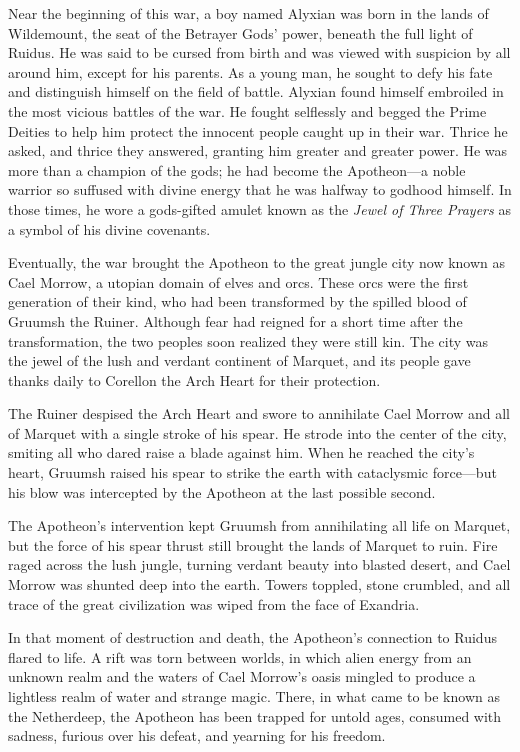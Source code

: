 \documentclass[10pt,a4paper,twoside,fancy,bg=print,twocolumn,openany,nodeprecatedcode]{dndbook}
\begin{document}
Near the beginning of this war, a boy named Alyxian was born in the lands of Wildemount, the seat of the Betrayer Gods' power, beneath the full light of Ruidus. He was said to be cursed from birth and was viewed with suspicion by all around him, except for his parents. As a young man, he sought to defy his fate and distinguish himself on the field of battle. Alyxian found himself embroiled in the most vicious battles of the war. He fought selflessly and begged the Prime Deities to help him protect the innocent people caught up in their war. Thrice he asked, and thrice they answered, granting him greater and greater power. He was more than a champion of the gods; he had become the Apotheon—a noble warrior so suffused with divine energy that he was halfway to godhood himself. In those times, he wore a gods-gifted amulet known as the \textit{Jewel of Three Prayers} as a symbol of his divine covenants.

Eventually, the war brought the Apotheon to the great jungle city now known as Cael Morrow, a utopian domain of elves and orcs. These orcs were the first generation of their kind, who had been transformed by the spilled blood of Gruumsh the Ruiner. Although fear had reigned for a short time after the transformation, the two peoples soon realized they were still kin. The city was the jewel of the lush and verdant continent of Marquet, and its people gave thanks daily to Corellon the Arch Heart for their protection.

The Ruiner despised the Arch Heart and swore to annihilate Cael Morrow and all of Marquet with a single stroke of his spear. He strode into the center of the city, smiting all who dared raise a blade against him. When he reached the city's heart, Gruumsh raised his spear to strike the earth with cataclysmic force—but his blow was intercepted by the Apotheon at the last possible second.

The Apotheon's intervention kept Gruumsh from annihilating all life on Marquet, but the force of his spear thrust still brought the lands of Marquet to ruin. Fire raged across the lush jungle, turning verdant beauty into blasted desert, and Cael Morrow was shunted deep into the earth. Towers toppled, stone crumbled, and all trace of the great civilization was wiped from the face of Exandria.

In that moment of destruction and death, the Apotheon's connection to Ruidus flared to life. A rift was torn between worlds, in which alien energy from an unknown realm and the waters of Cael Morrow's oasis mingled to produce a lightless realm of water and strange magic. There, in what came to be known as the Netherdeep, the Apotheon has been trapped for untold ages, consumed with sadness, furious over his defeat, and yearning for his freedom.
\end{document}
